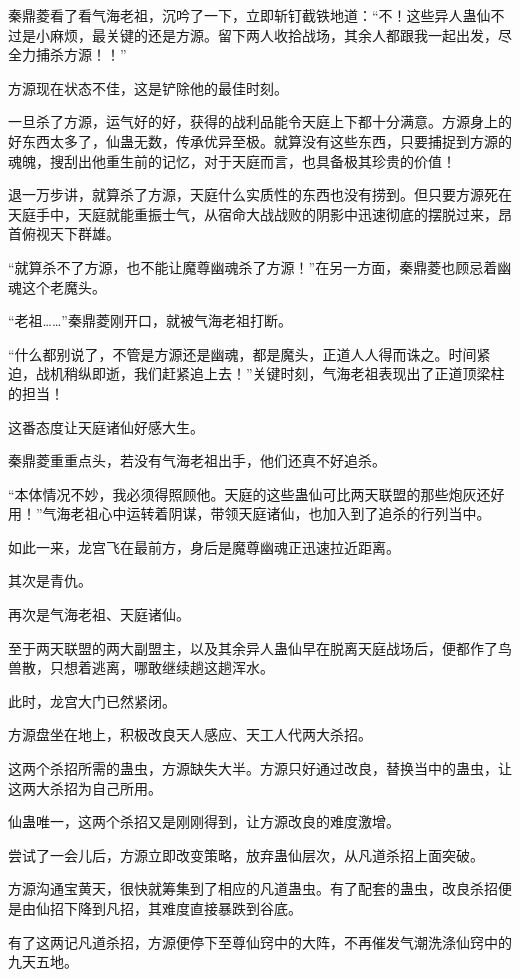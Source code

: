 \begin{this_body}
秦鼎菱看了看气海老祖，沉吟了一下，立即斩钉截铁地道：“不！这些异人蛊仙不过是小麻烦，最关键的还是方源。留下两人收拾战场，其余人都跟我一起出发，尽全力捕杀方源！！”

方源现在状态不佳，这是铲除他的最佳时刻。

一旦杀了方源，运气好的好，获得的战利品能令天庭上下都十分满意。方源身上的好东西太多了，仙蛊无数，传承优异至极。就算没有这些东西，只要捕捉到方源的魂魄，搜刮出他重生前的记忆，对于天庭而言，也具备极其珍贵的价值！

退一万步讲，就算杀了方源，天庭什么实质性的东西也没有捞到。但只要方源死在天庭手中，天庭就能重振士气，从宿命大战战败的阴影中迅速彻底的摆脱过来，昂首俯视天下群雄。

“就算杀不了方源，也不能让魔尊幽魂杀了方源！”在另一方面，秦鼎菱也顾忌着幽魂这个老魔头。

“老祖……”秦鼎菱刚开口，就被气海老祖打断。

“什么都别说了，不管是方源还是幽魂，都是魔头，正道人人得而诛之。时间紧迫，战机稍纵即逝，我们赶紧追上去！”关键时刻，气海老祖表现出了正道顶梁柱的担当！

这番态度让天庭诸仙好感大生。

秦鼎菱重重点头，若没有气海老祖出手，他们还真不好追杀。

“本体情况不妙，我必须得照顾他。天庭的这些蛊仙可比两天联盟的那些炮灰还好用！”气海老祖心中运转着阴谋，带领天庭诸仙，也加入到了追杀的行列当中。

如此一来，龙宫飞在最前方，身后是魔尊幽魂正迅速拉近距离。

其次是青仇。

再次是气海老祖、天庭诸仙。

至于两天联盟的两大副盟主，以及其余异人蛊仙早在脱离天庭战场后，便都作了鸟兽散，只想着逃离，哪敢继续趟这趟浑水。

此时，龙宫大门已然紧闭。

方源盘坐在地上，积极改良天人感应、天工人代两大杀招。

这两个杀招所需的蛊虫，方源缺失大半。方源只好通过改良，替换当中的蛊虫，让这两大杀招为自己所用。

仙蛊唯一，这两个杀招又是刚刚得到，让方源改良的难度激增。

尝试了一会儿后，方源立即改变策略，放弃蛊仙层次，从凡道杀招上面突破。

方源沟通宝黄天，很快就筹集到了相应的凡道蛊虫。有了配套的蛊虫，改良杀招便是由仙招下降到凡招，其难度直接暴跌到谷底。

有了这两记凡道杀招，方源便停下至尊仙窍中的大阵，不再催发气潮洗涤仙窍中的九天五地。


\end{this_body}
